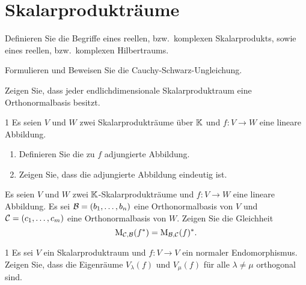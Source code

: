 \section{Skalarprodukträume}




\begin{question}[subtitle = Definitionen]{1}
  Definieren Sie die Begriffe eines reellen, bzw.\ komplexen Skalarprodukts, sowie eines reellen, bzw.\ komplexen Hilbertraums.
\end{question}


\begin{question}[subtitle = Cauchy-Schwarz]{1}
  Formulieren und Beweisen Sie die Cauchy-Schwarz-Ungleichung.
\end{question}


\begin{question}[subtitle = Existenz von Orthonormalbasen]{1}
  Zeigen Sie, dass jeder endlichdimensionale Skalarproduktraum eine Orthonormalbasis besitzt.
\end{question}


\begin{question}[subtitle = Definition und Eindeutigkeit der adjungierten Abbildung]{1}
  Es seien $V$ und $W$ zwei Skalarprodukträume über $\mathbb{K}$ und $f \colon V \to W$ eine lineare Abbildung.
  \begin{enumerate}[leftmargin=*]
    \item
      Definieren Sie die zu $f$ adjungierte Abbildung.
    \item
      Zeigen Sie, dass die adjungierte Abbildung eindeutig ist.
  \end{enumerate}
\end{question}


\begin{question}[subtitle = Darstellende Matrix der adjungiertes Abbildung]{1}
  Es seien $V$ und $W$ zwei $\mathbb{K}$-Skalarprodukträume und $f \colon V \to W$ eine lineare Abbildung.
  Es sei $\mathcal{B} = (b_1, \dotsc, b_n)$ eine Orthonormalbasis von $V$ und $\mathcal{C} = (c_1, \dotsc, c_m)$ eine Orthonormalbasis von $W$.
  Zeigen Sie die Gleichheit
  \[
      \operatorname{M}_{\mathcal{C}, \mathcal{B}}(f^*)
    = \operatorname{M}_{\mathcal{B}, \mathcal{C}}(f)^*.
  \]
\end{question}


\begin{question}[subtitle = Orthogonalität der Eigenräume normaler Endomorphismen]{1}
  Es sei $V$ ein Skalarproduktraum und $f \colon V \to V$ ein normaler Endomorphismus.
  Zeigen Sie, dass die Eigenräume $V_\lambda(f)$ und $V_\mu(f)$ für alle $\lambda \neq \mu$ orthogonal sind.
\end{question}


